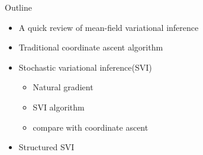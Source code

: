 \documentclass[aspectratio=169]{beamer}
\newenvironment{greytext}{\color{gray}}{\ignorespacesafterend}
\begin{document}
\begin{frame}{Outline}

    \begin{itemize}
    \begin{greytext}
      \item A quick review of mean-field variational inference
      \item Traditional coordinate ascent algorithm
    \end{greytext}
      \item Stochastic variational inference(SVI)
      \begin{itemize}
          \item Natural gradient
          \item SVI algorithm
          \item compare with coordinate ascent 
      \end{itemize}
    \begin{greytext}
      \item Structured SVI
      \end{greytext}
    \end{itemize}
\end{frame}
\end{document}

